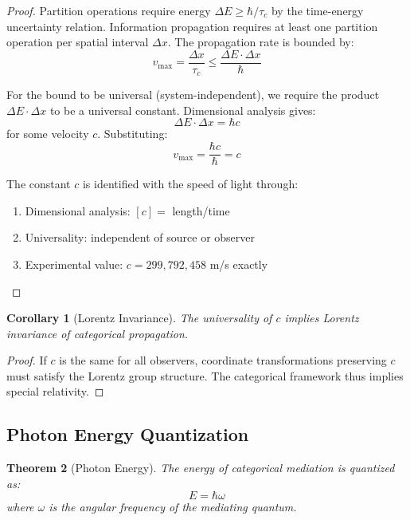 \documentclass[aps,prl,twocolumn,superscriptaddress,floatfix]{revtex4-2}
\newtheorem{theorem}{Theorem}
\newtheorem{corollary}[theorem]{Corollary}
\begin{document}
\begin{proof}
Partition operations require energy $\Delta E \geq \hbar/\tau_c$ by the time-energy uncertainty relation. Information propagation requires at least one partition operation per spatial interval $\Delta x$. The propagation rate is bounded by:
\begin{equation}
v_{\max} = \frac{\Delta x}{\tau_c} \leq \frac{\Delta E \cdot \Delta x}{\hbar}
\end{equation}

For the bound to be universal (system-independent), we require the product $\Delta E \cdot \Delta x$ to be a universal constant. Dimensional analysis gives:
\begin{equation}
\Delta E \cdot \Delta x = \hbar c
\end{equation}
for some velocity $c$. Substituting:
\begin{equation}
v_{\max} = \frac{\hbar c}{\hbar} = c
\end{equation}

The constant $c$ is identified with the speed of light through:
\begin{enumerate}
\item Dimensional analysis: $[c] = $ length/time
\item Universality: independent of source or observer
\item Experimental value: $c = 299,792,458$ m/s exactly
\end{enumerate}
\end{proof}

\begin{corollary}[Lorentz Invariance]
The universality of $c$ implies Lorentz invariance of categorical propagation.
\end{corollary}

\begin{proof}
If $c$ is the same for all observers, coordinate transformations preserving $c$ must satisfy the Lorentz group structure. The categorical framework thus implies special relativity.
\end{proof}

\subsection{Photon Energy Quantization}

\begin{theorem}[Photon Energy]
The energy of categorical mediation is quantized as:
\begin{equation}
E = \hbar\omega
\end{equation}
where $\omega$ is the angular frequency of the mediating quantum.
\end{theorem}
\end{document}
